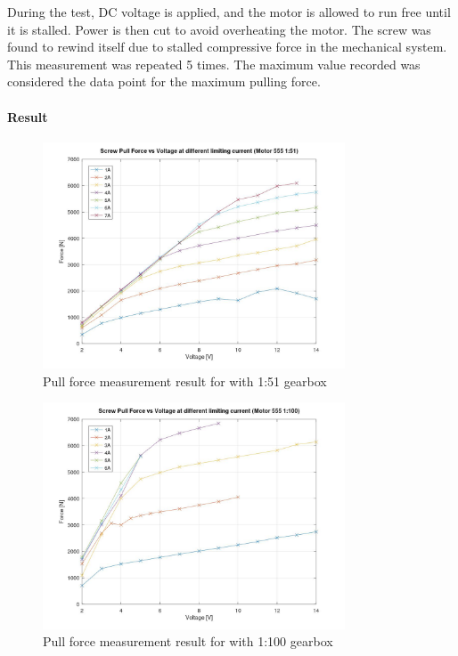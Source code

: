 During the test, DC voltage is applied, and the motor is allowed to run free until it is stalled. Power is then cut to avoid overheating the motor. The screw was found to rewind itself due to stalled compressive force in the mechanical system. This measurement was repeated 5 times. The maximum value recorded was considered the data point for the maximum pulling force.

\clearpage
\paragraph{Result}

\begin{figure}[H]
    \centering
    \includegraphics[width=0.8\textwidth]{images/05/image112.jpg}
    \caption{Pull force measurement result for with 1:51 gearbox}
    \label{fig:pull-force-measurement-result-1}
\end{figure}

\begin{figure}[H]
    \centering
    \includegraphics[width=0.8\textwidth]{images/05/image45.jpg}
    \caption{Pull force measurement result for with 1:100 gearbox}
    \label{fig:pull-force-measurement-result-2}
\end{figure}

